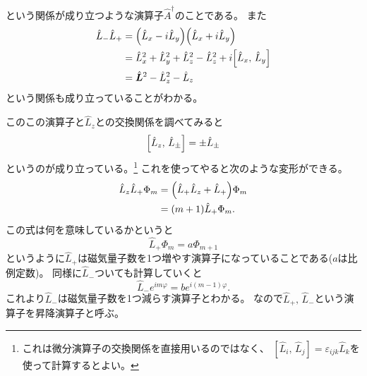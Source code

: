 \documentclass[../master.tex]{subfiles}
\begin{document}
という関係が成り立つような演算子\(\hat{A}^\dag\)のことである。
また
\begin{equation}\begin{aligned}[b]
    \hat{L}_- \hat{L}_+ & = \qty(\hat{L}_x - i \hat{L}_y)\qty(\hat{L}_x + i\hat{L}_y)                         \\
	                    & =\hat{L}_x^2+\hat{L}_y^2 + \hat{L}_z^2 - \hat{L}_z^2 + i\qty[\hat{L}_x,\,\hat{L}_y] \\
	                    & =\hat{\vb*{L}}^2 -\hat{L}_z^2 -\hat{L}_z
\end{aligned}\end{equation}
という関係も成り立っていることがわかる。

このこの演算子と\(\hat{L}_z\)との交換関係を調べてみると
\begin{equation}
	\qty[\hat{L}_z,\,\hat{L}_\pm] = \pm \hat{L}_\pm
\end{equation}
というのが成り立っている。\footnote{これは微分演算子の交換関係を直接用いるのではなく、
	\([\hat{L}_i,\,\hat{L}_j]=\varepsilon_{ijk}\hat{L}_k\)を使って計算するとよい。}
これを使ってやると次のような変形ができる。
\begin{equation}\begin{aligned}[b]
    \hat{L}_z\hat{L}_+ \Phi_m
	 & = \qty(\hat{L}_+\hat{L}_z + \hat{L}_+)\Phi_m \\
	 & = (m+1)\hat{L}_+\Phi_m.
\end{aligned}\end{equation}
この式は何を意味しているかというと
\begin{equation}
	\hat{L}_+ \Phi_m = a \Phi_{m+1}
\end{equation}
というように\(\hat{L}_+\)は磁気量子数を1つ増やす演算子になっていることである(\(a\)は比例定数)。
同様に\(\hat{L}_-\)ついても計算していくと
\begin{equation}
	\hat{L}_- e^{im\varphi} =b e^{i(m-1)\varphi}.
\end{equation}
これより\(\hat{L}_-\)は磁気量子数を1つ減らす演算子とわかる。
なので\(\hat{L}_+,\,\hat{L}_-\)という演算子を昇降演算子と呼ぶ。
\end{document}
